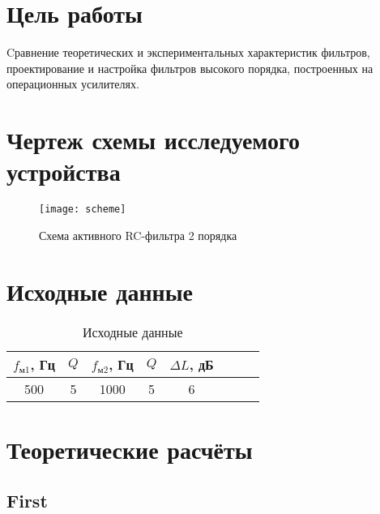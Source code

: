 





\section{Цель работы}

Cравнение теоретических и экспериментальных характеристик фильтров,
проектирование и настройка фильтров высокого порядка, построенных на
операционных усилителях. 

\section{Чертеж схемы исследуемого устройства}

\begin{figure}[H]
\begin{center}
	\texttt{[image: scheme]}
	\caption{Схема активного RC-фильтра 2 порядка}
\end{center}
\end{figure}

\section{Исходные данные}

\begin{table}[H]
\begin{center}
	\caption{Исходные данные}
	\def\tabcolsep{20pt}
	\begin{tabular}{|c|c|c|c|c|c|c|c|}
		\hline
		$f_{\text{м1}}$, Гц &
		$Q$ &
		$f_{\text{м2}}$, Гц &
		$Q$ &
		$\Delta L$, дБ \\
		\hline
		500 &
		5 &
		1000 &
		5 &
		6 \\
	    \hline	
	\end{tabular}
\end{center}
\end{table}

\section{Теоретические расчёты}

\subsection{First}

